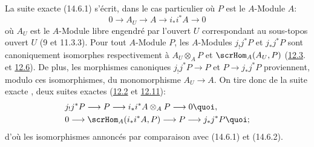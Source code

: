 La suite exacte (14.6.1) s'écrit, dans le cas particulier où
$P$ est le $A$-Module $A$:
\begin{equation*}
0\longrightarrow A_U\longrightarrow A\longrightarrow
i_{\ast}i^{\ast}A\longrightarrow 0\tag{14.10.1}
\end{equation*}
où $A_U$ est le $A$-Module libre engendré par l'ouvert $U$
correspondant au sous-topos ouvert $U$ (9 et 11.3.3). Pour tout
$A$-Module $P$, les $A$-Modules $j_{!}j^{\ast}P$ et
$j_{\ast}j^{\ast}P$ sont canoniquement isomorphes respectivement à
$A_U\otimes_A P$ et $\scrHom_A(A_{U}, P)$ (\hyperref[IV.prop12.3]{12.3}. et
\hyperref[IV.cor12.6]{12.6}). De plus, les morphismes canoniques
$j_{!}j^{\ast}P\rightarrow P$ et $P\rightarrow j_{\ast}j^{\ast}P$
proviennent, modulo ces isomorphismes, du monomorphisme
$A_U\rightarrow A$. On tire donc de la suite exacte , deux
suites exactes (\hyperref[IV.subsec12.2]{12.2} et \hyperref[IV.prop12.11]{12.11}):
\begin{align*}
& j_{!}j^{\ast}P\longrightarrow P\longrightarrow
i_{\ast}i^{\ast}A\otimes_AP\longrightarrow 0{\quoi},\\
& 0\longrightarrow \scrHom_A(i_{\ast}i^{\ast}A, P)\longrightarrow
P\longrightarrow j_{\ast} j^{\ast}P{\quoi};
\end{align*}
d'où les isomorphismes annoncés par comparaison avec (14.6.1)
et (14.6.2).

